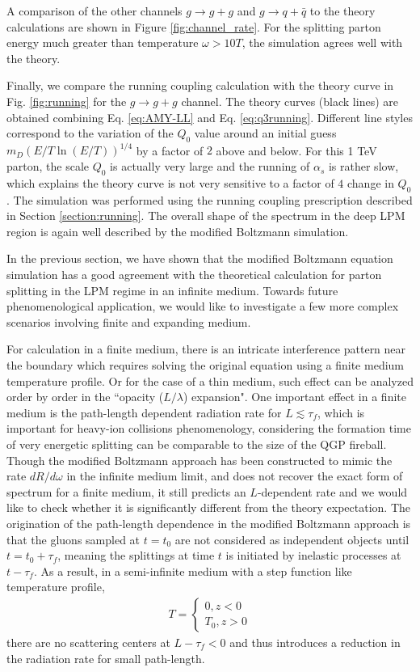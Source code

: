 A comparison of the other channels $g\rightarrow g+g$ and $g\rightarrow q+\bar{q}$ to the theory calculations are shown in Figure \ref{fig:channel_rate}.
For the splitting parton energy much greater than temperature $\omega > 10 T$, the simulation agrees well with the theory. 

Finally, we compare the running coupling calculation with the theory curve in Fig. \ref{fig:running} for the $g\rightarrow g+g$ channel.
The theory curves (black lines) are obtained combining Eq. \ref{eq:AMY-LL} and Eq. \ref{eq:q3running}.
Different line styles correspond to the variation of the $Q_0$ value around an initial guess $m_D (E/T \ln(E/T) )^{1/4}$ by a factor of $2$ above and below.
For this 1 TeV parton, the scale $Q_0$ is actually very large and the running of $\alpha_s$ is rather slow, which explains the theory curve is not very sensitive to a factor of $4$ change in $Q_0$.
The simulation was performed using the running coupling prescription described in Section \ref{section:running}.
The overall shape of the spectrum in the deep LPM region is again well described by the modified Boltzmann simulation. 


In the previous section, we have shown that the modified Boltzmann equation simulation has a good agreement with the theoretical calculation for parton splitting in the LPM regime in an infinite medium.
Towards future phenomenological application, we would like to investigate a few more complex scenarios involving finite and expanding medium.

For calculation in a finite medium, there is an intricate interference pattern near the boundary which requires solving the original equation using a finite medium temperature profile. 
Or for the case of a thin medium, such effect can be analyzed order by order in the ``opacity ($L/\lambda$) expansion". 
One important effect in a finite medium is the path-length dependent radiation rate for $L \lesssim \tau_f$, which is important for heavy-ion collisions phenomenology, considering the formation time of very energetic splitting can be comparable to the size of the QGP fireball.
Though the modified Boltzmann approach has been constructed to mimic the rate $dR/d\omega$ in the infinite medium limit, and does not recover the exact form of spectrum for a finite medium, it still predicts an $L$-dependent rate and we would like to check whether it is significantly different from the theory expectation.
The origination of the path-length dependence in the modified Boltzmann approach is that the gluons sampled at $t=t_0$ are not considered as independent objects until $t = t_0+\tau_f$, meaning the splittings at time $t$ is initiated by inelastic processes at $t-\tau_f$.
As a result, in a semi-infinite medium with a step function like temperature profile, 
\begin{eqnarray}
T = \begin{cases}
0 , z<0\\
T_0, z>0
\end{cases}
\end{eqnarray}
there are no scattering centers at $L-\tau_f<0$ and thus introduces a reduction in the radiation rate for small path-length.

